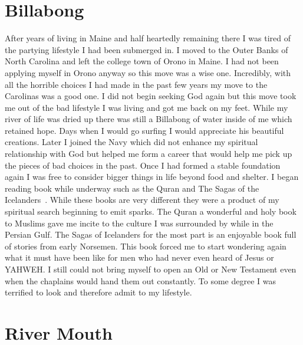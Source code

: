 \documentclass[11pt,a4paper]{scrartcl} %
\begin{document}
\section{Billabong}
\begin{doublespace}
After years of living in Maine and half heartedly remaining there I was tired of the partying lifestyle I had been submerged in. I moved to the Outer Banks of North Carolina and left the college town of Orono in Maine. I had not been applying myself in Orono anyway so this move was a wise one. Incredibly, with all the horrible choices I had made in the past few years my move to the Carolinas was a good one. I did not begin seeking God again but this move took me out of the bad lifestyle I was living and got me back on my feet. While my river of life was dried up there was still a Billabong of water inside of me which retained hope. Days when I would go surfing I would appreciate his beautiful creations. Later I joined the Navy which did not enhance my spiritual relationship with God but helped me form a career that would help me pick up the pieces of bad choices in the past. Once I had formed a stable foundation again I was free to consider bigger things in life beyond food and shelter. I began reading book while underway such as the Quran and The Sagas of the Icelanders~\cite{Viking}. While these books are very different they were a product of my spiritual search beginning to emit sparks. The Quran a wonderful and holy book to Muslims gave me incite to the culture I was surrounded by while in the Persian Gulf. The Sagas of Icelanders for the most part is an enjoyable book full of stories from early Norsemen. This book forced me to start wondering again what it must have been like for men who had never even heard of Jesus or YAHWEH. I still could not bring myself to open an Old or New Testament even when the chaplains would hand them out constantly. To some degree I was terrified to look and therefore admit to my lifestyle. 
\end{doublespace}
    \section{River Mouth}
\clearpage
    \nocite{*}
    
    
\end{document}

